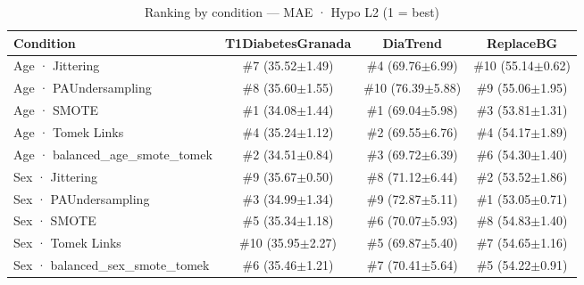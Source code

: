 \begin{table}[htbp]
\centering
\small
\caption{Ranking by condition — MAE · Hypo L2  (1 = best)}
\label{tab:ranking_mae_tbr_2_family_mechanism_guided}
\begin{tabular}{lccc}
\toprule
\textbf{Condition} & \textbf{T1DiabetesGranada} & \textbf{DiaTrend} & \textbf{ReplaceBG} \\
\midrule
Age · Jittering & \#7 (35.52$\pm$1.49) & \#4 (69.76$\pm$6.99) & \#10 (55.14$\pm$0.62) \\
Age · PAUndersampling & \#8 (35.60$\pm$1.55) & \#10 (76.39$\pm$5.88) & \#9 (55.06$\pm$1.95) \\
Age · SMOTE & \#1 (34.08$\pm$1.44) & \#1 (69.04$\pm$5.98) & \#3 (53.81$\pm$1.31) \\
Age · Tomek Links & \#4 (35.24$\pm$1.12) & \#2 (69.55$\pm$6.76) & \#4 (54.17$\pm$1.89) \\
Age · balanced_age_smote_tomek & \#2 (34.51$\pm$0.84) & \#3 (69.72$\pm$6.39) & \#6 (54.30$\pm$1.40) \\
\midrule
Sex · Jittering & \#9 (35.67$\pm$0.50) & \#8 (71.12$\pm$6.44) & \#2 (53.52$\pm$1.86) \\
Sex · PAUndersampling & \#3 (34.99$\pm$1.34) & \#9 (72.87$\pm$5.11) & \#1 (53.05$\pm$0.71) \\
Sex · SMOTE & \#5 (35.34$\pm$1.18) & \#6 (70.07$\pm$5.93) & \#8 (54.83$\pm$1.40) \\
Sex · Tomek Links & \#10 (35.95$\pm$2.27) & \#5 (69.87$\pm$5.40) & \#7 (54.65$\pm$1.16) \\
Sex · balanced_sex_smote_tomek & \#6 (35.46$\pm$1.21) & \#7 (70.41$\pm$5.64) & \#5 (54.22$\pm$0.91) \\
\bottomrule
\end{tabular}
\end{table}